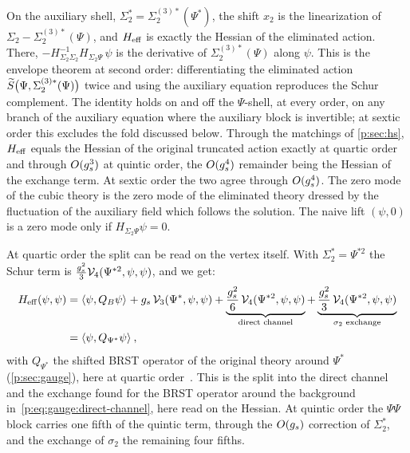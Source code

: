 On the auxiliary shell, $\Sigma_2^* = \Sigma_2^{(3)*}(\Psi^*)$, the shift $x_2$ is the linearization of $\Sigma_2 - \Sigma_2^{(3)*}(\Psi)$, and $H_{\rm eff}$ is exactly the Hessian of the eliminated action.
There, $- H_{\Sigma_2 \Sigma_2}^{-1} H_{\Sigma_2 \Psi} \, \psi$ is the derivative of $\Sigma_2^{(3)*}(\Psi)$ along $\psi$.
This is the envelope theorem at second order: differentiating the eliminated action $\widetilde{S}_{}\big(\Psi, \Sigma_2^{(3)*}(\Psi)\big)$ twice and using the auxiliary equation reproduces the Schur complement.
The identity holds on and off the $\Psi$-shell, at every order, on any branch of the auxiliary equation where the auxiliary block is invertible; at sextic order this excludes the fold discussed below.
Through the matchings of \cref{p:sec:hs}, $H_{\rm eff}$ equals the Hessian of the original truncated action exactly at quartic order and through $O(g_s^3)$ at quintic order, the $O(g_s^4)$ remainder being the Hessian of the exchange term.
At sextic order the two agree through $O(g_s^4)$.
The zero mode of the cubic theory is the zero mode of the eliminated theory dressed by the fluctuation of the auxiliary field which follows the solution.
The naive lift $(\psi, 0)$ is a zero mode only if $H_{\Sigma_2 \Psi} \psi = 0$.

At quartic order the split can be read on the vertex itself.
With $\Sigma_2^* = \Psi^{* 2}$ the Schur term is $\tfrac{g_s^2}{3} \mathcal{V}_{4}(\Psi^{* 2}, \psi, \psi)$, and we get:
\begin{equation}
  \label{p:eq:sol:channels}
  \begin{aligned}
    H_{\rm eff}(\psi, \psi)
      &
      = \braket{\psi, Q_B \psi}_{}
        + g_s \, \mathcal{V}_{3}(\Psi^*, \psi, \psi)
        + \underbrace{\frac{g_s^2}{6} \, \mathcal{V}_{4}(\Psi^{* 2}, \psi, \psi)}_{\text{direct channel}}
        + \underbrace{\frac{g_s^2}{3} \, \mathcal{V}_{4}(\Psi^{* 2}, \psi, \psi)}_{\sigma_2 \text{ exchange}}
      \\
      &
      = \braket{\psi, Q_{\Psi^*} \psi}_{},
  \end{aligned}
\end{equation}
with $Q_{\Psi^*}$ the shifted BRST operator of the original theory around $\Psi^*$ (\cref{p:sec:gauge}), here at quartic order~\cite{Zwiebach:1993:ClosedStringField}.
This is the split into the direct channel and the exchange found for the BRST operator around the background in~\eqref{p:eq:gauge:direct-channel}, here read on the Hessian.
At quintic order the $\Psi \Psi$ block carries one fifth of the quintic term, through the $O(g_s)$ correction of $\Sigma_2^*$, and the exchange of $\sigma_2$ the remaining four fifths.

